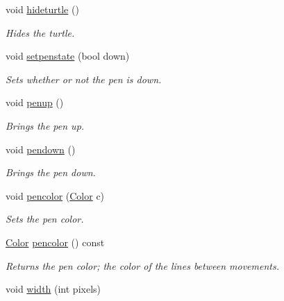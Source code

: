 \begin{DoxyCompactItemize}
void \hyperlink{classcturtle_1_1Turtle_a9703e6352bb71bb995ad0d364be66a49}{hideturtle} ()
\begin{DoxyCompactList}\small\item\em Hides the turtle. \end{DoxyCompactList}\item 
\mbox{\label{classcturtle_1_1Turtle_abaa5b7f8b659975bcfc9a787a93c123d}} 
void \hyperlink{classcturtle_1_1Turtle_abaa5b7f8b659975bcfc9a787a93c123d}{setpenstate} (bool down)
\begin{DoxyCompactList}\small\item\em Sets whether or not the pen is down. \end{DoxyCompactList}\item 
\mbox{\label{classcturtle_1_1Turtle_a2ee85233603aac7e5e6bd9ede80d2970}} 
void \hyperlink{classcturtle_1_1Turtle_a2ee85233603aac7e5e6bd9ede80d2970}{penup} ()
\begin{DoxyCompactList}\small\item\em Brings the pen up. \end{DoxyCompactList}\item 
\mbox{\label{classcturtle_1_1Turtle_a8256411dae140f1e09058afecf7e6e8e}} 
void \hyperlink{classcturtle_1_1Turtle_a8256411dae140f1e09058afecf7e6e8e}{pendown} ()
\begin{DoxyCompactList}\small\item\em Brings the pen down. \end{DoxyCompactList}\item 
void \hyperlink{classcturtle_1_1Turtle_a9fb220cdbffecdaaa8f8a722ef624eb8}{pencolor} (\hyperlink{classcturtle_1_1Color}{Color} c)
\begin{DoxyCompactList}\small\item\em Sets the pen color. \end{DoxyCompactList}\item 
\hyperlink{classcturtle_1_1Color}{Color} \hyperlink{classcturtle_1_1Turtle_ab14dd65bd0e882b815755656072a9cdd}{pencolor} () const
\begin{DoxyCompactList}\small\item\em Returns the pen color; the color of the lines between movements. \end{DoxyCompactList}\item 
void \hyperlink{classcturtle_1_1Turtle_a1b5378167a4425fa721552bab0402afc}{width} (int pixels)

\end{DoxyCompactItemize}
